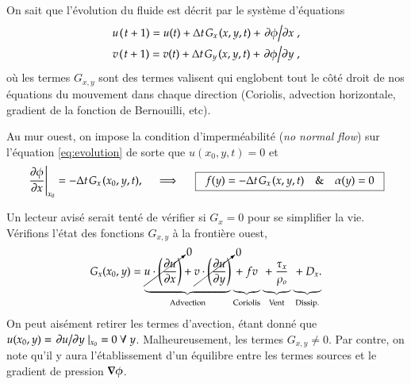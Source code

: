 \documentclass[10pt]{article}
\numberwithin{equation}{section}
\newcommand{\bigno}{\vphantom{\qty(\frac{d}{q})}}
\newcommand{\pt}{\hspace{1pt}}
\begin{document}
On sait que l'évolution du fluide est décrit par le système d'équations
\begin{subequations}
\begin{align}
u\pt (\pt t+1)  = u(t) + \Delta t \pt G_x\pt(x,y,t) + \pdv*{\phi}{x}, \label{eq:evolution}\\
v\pt (\pt t+1)  = v(t) + \Delta t \pt G_y\pt(x,y,t) + \pdv*{\phi}{y},
\end{align}
\end{subequations}
où les termes \(G_{x,y}\) sont des termes valisent qui englobent tout le côté droit de nos équations du mouvement dans chaque direction (Coriolis, advection horizontale, gradient de la fonction de Bernouilli, etc).\bigskip

Au mur ouest, on impose la condition d'imperméabilité (\emph{no normal flow}) sur l'équation \ref{eq:evolution} de sorte que \(u(x_0,y,t) = 0\) et
\begin{equation}
\eval{\pdv{\phi}{x}}_{x_0} = -\Delta t \pt G_x\pt(x_0,y,t),
\hspace{0.5cm}\Longrightarrow\hspace{0.5cm}
\boxed{\hspace{0.2cm}f(y) = -\Delta t \pt G_x\pt(x,y,t) \hspace{0.35cm}\&\hspace{0.35cm} \alpha(y) = 0 \hspace{0.2cm}}
\end{equation}

Un lecteur avisé serait tenté de vérifier si \(G_x = 0\) pour se simplifier la vie.
Vérifions l'état des fonctions \(G_{x,y}\) à la frontière ouest,
\begin{equation}
G_x(x_0,y) = \underbrace{\cancelto{0}{u\cdot\qty(\pdv{u}{x})} + \cancelto{0}{v\cdot\qty(\pdv{u}{y})}}_\text{Advection}
\underbrace{\ +\ f v \ \bigno}_\text{Coriolis}
\underbrace{\ +\ \frac{\tau_x}{\rho_o}\ \bigno}_\text{Vent}
\underbrace{\ +\ D_x. \bigno}_\text{Dissip.}
\end{equation}
On peut aisément retirer les termes d'avection, étant donné que \({u(x_0,y)=\pdv*{u}{y}|_{x_0} = 0\ \forall\ y}\).
Malheureusement, les termes \({G_{x,y} \neq 0}\).
Par contre, on note qu'il y aura l'établissement d'un équilibre entre les termes sources et le gradient de pression \(\gradient{\phi}\).


\end{document}
